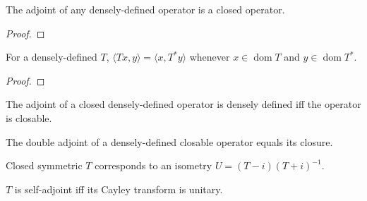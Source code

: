 \begin{theorem}
  \label{thm:pmap-adjoint-closed}
  \leanok
  The adjoint of any densely-defined operator is a closed operator.
\end{theorem}
\begin{proof}
  \leanok
\end{proof}

\begin{theorem}
  \label{thm:pmap-adjoint-formal}
  \leanok
  For a densely-defined $T$, $\langle T x, y\rangle = \langle x,
  T^{*} y\rangle$ whenever $x \in \operatorname{dom} T$ and $y \in
  \operatorname{dom} T^{*}$.
\end{theorem}
\begin{proof}
  \leanok
\end{proof}


\begin{theorem}
  \label{thm:adjoint-dense-iff-closable}
  \leanok
  The adjoint of a closed densely-defined operator is densely defined
  iff the operator is closable.
\end{theorem}

\begin{theorem}[Rudin 13.14, $T^{**} = \overline{T}$]
  \label{thm:adjoint-adjoint-closure}
  \leanok
  The double adjoint of a densely-defined closable operator equals
  its closure.
\end{theorem}

\begin{theorem}
  \label{thm:cayley-transform}
  \leanok
  Closed symmetric $T$ corresponds to an isometry
  $U = (T - i)(T + i)^{-1}$.
\end{theorem}

\begin{theorem}
  \label{thm:selfAdjoint-cayley-unitary}
  \leanok
  $T$ is self-adjoint iff its Cayley transform is unitary.
\end{theorem}

